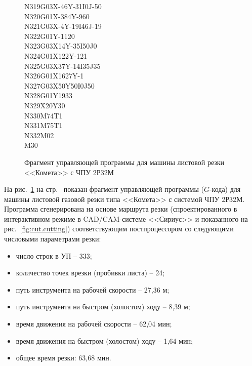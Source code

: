 \begin{figure}
\begin{multicols}{3}
    N319G03X-46Y-31I0J-50 \\
    N320G01X-384Y-960 \\
    N321G03X-4Y-19I46J-19 \\
    N322G01Y-1120 \\
    N323G03X14Y-35I50J0 \\
    N324G01X122Y-121  \\
    N325G03X37Y-14I35J35  \\
    N326G01X1627Y-1 \\
    N327G03X50Y50I0J50  \\
    N328G01Y1933  \\
    N329X20Y30  \\
    N330M74T1 \\
    N331M75T1 \\
    N332M02 \\
    M30
  \end{multicols}
  \caption{
    Фрагмент управляющей программы
    для машины листовой резки <<Комета>> с ЧПУ 2Р32М
  }
  \label{fig:cut.control-program}
\end{figure}

На рис.~\ref{fig:cut.control-program}
на стр.~\pageref{fig:cut.control-program}
показан фрагмент управляющей программы
($G$-кода) для машины листовой газовой резки
типа <<Комета>> с системой ЧПУ 2Р32М.
Программа сгенерирована на основе маршрута резки
(спроектированного в интерактивном режиме в
CAD/CAM-системе <<Сириус>>
и показанного на рис.~\ref{fig:cut.cutting})
соответствующим постпроцессором со
следующими числовыми параметрами резки:
\begin{itemize}
  \item	число строк в УП – 333;
  \item	количество точек врезки (пробивки листа) – 24;
  \item	путь инструмента на рабочей скорости – 27,36 м;
  \item	путь инструмента на быстром (холостом) ходу – 8,39 м;
  \item	время движения на рабочей скорости – 62,04 мин;
  \item	время движения на быстром (холостом) ходу – 1,64 мин;
  \item	общее время резки: 63,68 мин.
\end{itemize}

